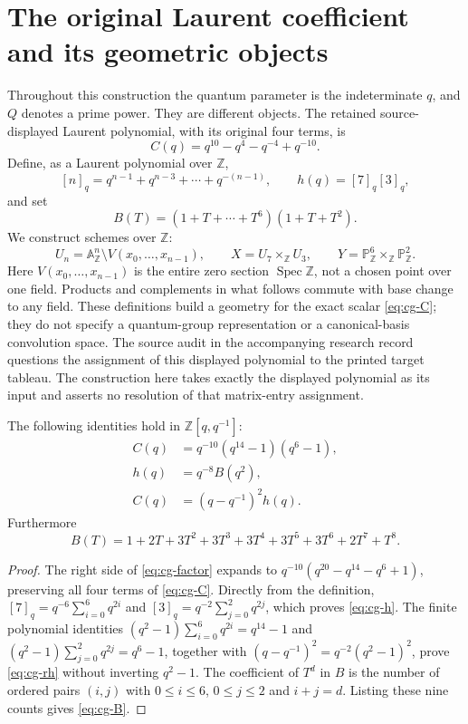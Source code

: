 \section{The original Laurent coefficient and its geometric objects}
\label{sec:cg-original}
Throughout this construction the quantum parameter is the indeterminate
$q$, and $Q$ denotes a prime power. They are different objects. The retained
source-displayed Laurent polynomial, with its original four terms, is
\begin{equation}\label{eq:cg-C}
 C(q)=q^{10}-q^4-q^{-4}+q^{-10}.
\end{equation}
Define, as a Laurent polynomial over $\mathbb Z$,
\[
 [n]_q=q^{n-1}+q^{n-3}+\cdots+q^{-(n-1)},\qquad
 h(q)=[7]_q[3]_q,
\]
and set
\[
 B(T)=(1+T+\cdots+T^6)(1+T+T^2).
\]
We construct schemes over $\mathbb Z$:
\[
 U_n=\mathbb A^n_{\mathbb Z}\setminus V(x_0,\ldots,x_{n-1}),
 \qquad X=U_7\times_{\mathbb Z}U_3,\qquad
 Y=\mathbb P^6_{\mathbb Z}\times_{\mathbb Z}\mathbb P^2_{\mathbb Z}.
\]
Here $V(x_0,\ldots,x_{n-1})$ is the entire zero section
$\operatorname{Spec}\mathbb Z$, not a chosen point over one field.
Products and complements in what follows commute with base change to any
field. These definitions build a geometry for the exact scalar
\eqref{eq:cg-C}; they do not specify a quantum-group representation or a
canonical-basis convolution space. The source audit in the accompanying
research record questions the assignment of this displayed polynomial to
the printed target tableau. The construction here takes exactly the
displayed polynomial as its input and asserts no resolution of that
matrix-entry assignment.

\begin{proposition}\label{prop:cg-factor}
The following identities hold in $\mathbb Z[q,q^{-1}]$:
\begin{align}
 C(q)&=q^{-10}(q^{14}-1)(q^6-1),\label{eq:cg-factor}\\
 h(q)&=q^{-8}B(q^2),\label{eq:cg-h}\\
 C(q)&=(q-q^{-1})^2h(q).\label{eq:cg-rh}
\end{align}
Furthermore
\begin{equation}\label{eq:cg-B}
 B(T)=1+2T+3T^2+3T^3+3T^4+3T^5+3T^6+2T^7+T^8.
\end{equation}
\end{proposition}
\begin{proof}
The right side of \eqref{eq:cg-factor} expands to
$q^{-10}(q^{20}-q^{14}-q^6+1)$, preserving all four terms of
\eqref{eq:cg-C}. Directly from the definition,
$[7]_q=q^{-6}\sum_{i=0}^6q^{2i}$ and
$[3]_q=q^{-2}\sum_{j=0}^2q^{2j}$, which proves
\eqref{eq:cg-h}. The finite polynomial identities
$(q^2-1)\sum_{i=0}^6q^{2i}=q^{14}-1$ and
$(q^2-1)\sum_{j=0}^2q^{2j}=q^6-1$, together with
$(q-q^{-1})^2=q^{-2}(q^2-1)^2$, prove \eqref{eq:cg-rh}
without inverting $q^2-1$. The coefficient of $T^d$ in $B$ is the
number of ordered pairs $(i,j)$ with $0\leq i\leq6$, $0\leq j\leq2$
and $i+j=d$. Listing these nine counts gives \eqref{eq:cg-B}.
\end{proof}

